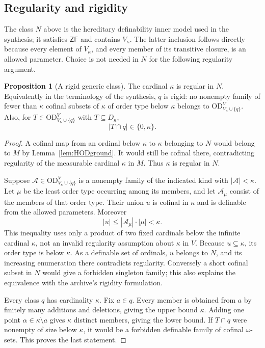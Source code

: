 \documentclass[11pt,letterpaper]{article}
\theoremstyle{definition}
\newtheorem{proposition}[definition]{Proposition}
\numberwithin{equation}{section}
\newcommand{\ZF}{\mathsf{ZF}}
\newcommand{\OD}{\mathrm{OD}}
\newcommand{\ODlow}{\OD_{V_\kappa\cup\{q\}}^{V}}
\begin{document}
\subsection{Regularity and rigidity}

The class $N$ above is the hereditary definability inner model used in the
synthesis; it satisfies $\ZF$ and contains $V_\kappa$. The latter
inclusion follows directly because every element of $V_\kappa$, and every
member of its transitive closure, is an allowed parameter. Choice is not
needed in $N$ for the following regularity argument.

\begin{proposition}[A rigid generic class]\label{prop:rigidity}
The cardinal $\kappa$ is regular in $N$. Equivalently in the terminology
of the synthesis, $q$ is rigid: no nonempty family of fewer than $\kappa$
cofinal subsets of $\kappa$ of order type below $\kappa$ belongs to
$\ODlow$. Also, for $T\in\ODlow$ with $T\subseteq D_\kappa$,
\[
 |T\cap q|\in\{0,\kappa\}.
\]
\end{proposition}

\begin{proof}
A cofinal map from an ordinal below $\kappa$ to $\kappa$ belonging to $N$
would belong to $M$ by Lemma~\ref{lem:HODground}. It would still be
cofinal there, contradicting regularity of the measurable cardinal
$\kappa$ in $M$. Thus $\kappa$ is regular in $N$.

Suppose $\mathcal A\in\ODlow$ is a nonempty family of the indicated
kind with $|\mathcal A|<\kappa$. Let $\mu$ be the least order type occurring
among its members, and let $\mathcal A_\mu$ consist of the members of that
order type. Their union $u$ is cofinal in $\kappa$ and is definable from
the allowed parameters. Moreover
\[
 |u|\le |\mathcal A_\mu|\cdot |\mu|<\kappa.
\]
This inequality uses only a product of two fixed cardinals below the
infinite cardinal $\kappa$, not an invalid regularity assumption about
$\kappa$ in $V$. Because $u\subseteq\kappa$, its order type is below
$\kappa$. As a definable set of ordinals, $u$ belongs to $N$, and its
increasing enumeration there contradicts regularity. Conversely a short
cofinal subset in $N$ would give a forbidden singleton family; this also
explains the equivalence with the archive's rigidity formulation.

Every class $q$ has cardinality $\kappa$. Fix $a\in q$. Every member is
obtained from $a$ by finitely many additions and deletions, giving the
upper bound $\kappa$. Adding one point $\alpha\in\kappa\setminus a$
gives $\kappa$ distinct members, giving the lower bound. If $T\cap q$
were nonempty of size below $\kappa$, it would be a forbidden definable
family of cofinal $\omega$-sets. This proves the last statement.
\end{proof}
\end{document}

